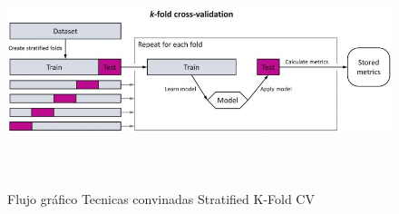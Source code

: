 \begin{figure}[H]
  \centering
  \includegraphics[width=6.06111in,height=2.68611in]{img/analisis de metodologia/463627_1_En_8_Fig8_HTML.jpg}
  \caption{Flujo gráfico Tecnicas convinadas Stratified K-Fold CV}
  \label{fig:flujo_kfoldcvstratfield}
\end{figure}
